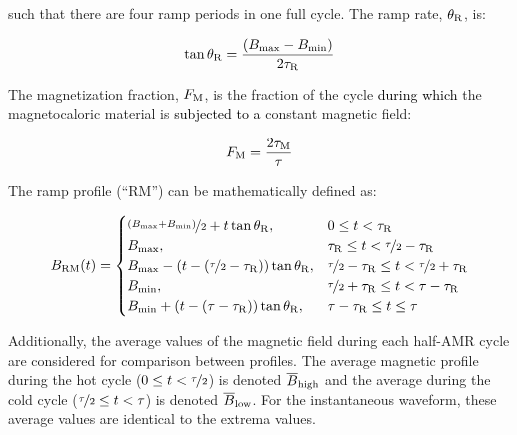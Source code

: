 \documentclass[referee]{svjour3}
\begin{document}
\noindent such that there are four ramp periods in one full cycle. The ramp rate, \(\theta_{\mathrm{R}}\), is:

\begin{equation}
\label{eq:202}
\tan \theta_{\mathrm{R}} = \frac{\left({B}_{\mathrm{max}} - {B}_{\mathrm{min}}\right)}{2\tau_{\mathrm{R}}}
\end{equation}


The magnetization fraction, \(F_{\mathrm{M}}\), is the fraction of the cycle \textcolor{black}{during which} the magnetocaloric material is \textcolor{black}{subjected to a} constant magnetic field:

\begin{equation}
\label{eq:204}
F_{\mathrm{M}} = \frac{2\tau_{\mathrm{M}}}{\tau}
\end{equation}


The ramp profile (``RM'') can be mathematically defined as:

\begin{equation}
{B}_{\mathrm{RM}}(t)=
\begin{cases}
\nicefrac{\left({B}_{\mathrm{max}} + {B}_{\mathrm{min}}\right)}{2} + t \tan \theta_{\mathrm{R}} , & 0 \le t < \tau_{\mathrm{R}} \\
{B}_{\mathrm{max}}, & \tau_{\mathrm{R}} \le t < \nicefrac{\tau}{2} - \tau_{\mathrm{R}}\\
{B}_{\mathrm{max}} - \left(t - \left(\nicefrac{\tau}{2} - \tau_{\mathrm{R}}\right)\right) \tan \theta_{\mathrm{R}} , & \nicefrac{\tau}{2} - \tau_{\mathrm{R}} \le t < \nicefrac{\tau}{2} + \tau_{\mathrm{R}} \\
{B}_{\mathrm{min}}, & \nicefrac{\tau}{2} + \tau_{\mathrm{R}} \le t < \tau - \tau_{\mathrm{R}}\\
{B}_{\mathrm{min}} + \left(t - \left(\tau - \tau_{\mathrm{R}}\right)\right) \tan \theta_{\mathrm{R}} , & \tau - \tau_{\mathrm{R}} \le t \le \tau \\
\end{cases}
\label{eq:203}
\end{equation}


Additionally, the average values of the magnetic field during each half-AMR cycle are considered for comparison between profiles. The average magnetic profile during the hot cycle ($0 \le t < \nicefrac{\tau}{2}$) is denoted $\overline{B}_{\mathrm{high}}$ and the average during the cold cycle  ($ \nicefrac{\tau}{2} \le t < \tau$) is denoted $\overline{B}_{\mathrm{low}}$. For the instantaneous waveform, these average values are identical to the extrema values.
\end{document}
